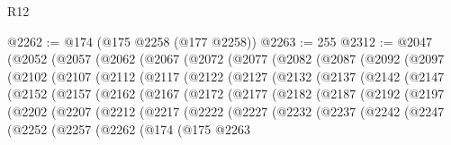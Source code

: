 \begin{lexlean}{R12}
\begin{coremodule}
@2262 := @174 (@175 @2258 (@177 @2258))
@2263 := 255
@2312 := @2047
    (@2052
      (@2057
        (@2062
          (@2067
            (@2072
              (@2077
                (@2082
                  (@2087
                    (@2092
                      (@2097
                        (@2102
                          (@2107
                            (@2112
                              (@2117
                                (@2122
                                  (@2127
                                    (@2132
                                      (@2137
                                        (@2142
                                          (@2147
                                            (@2152
                                              (@2157
                                                (@2162
                                                  (@2167
                                                    (@2172
                                                      (@2177
                                                        (@2182
                                                          (@2187
                                                            (@2192
                                                              (@2197
                                                                (@2202
                                                                  (@2207
                                                                    (@2212
                                                                      (@2217
                                                                        (@2222
                                                                          (@2227
                                                                            (@2232
                                                                              (@2237
                                                                                (@2242
                                                                                  (@2247
                                                                                    (@2252
                                                                                      (@2257
                                                                                        (@2262
                                                                                          (@174
                                                                                            (@175
                                                                                              @2263

\end{coremodule}
\end{lexlean}
